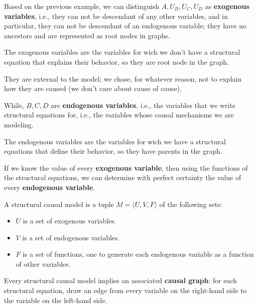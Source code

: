 Based on the previous example, we can distinguish $A, U_B, U_C, U_D$ as \textbf{
    exogenous variables}, i.e., they can not be descendant of any other variables, 
and in particular, they can not be descendant of an endogenous variable; they have 
no ancestors and are represented as root nodes in graphs.

\begin{definition}
    The exogenous variables are the variables for wich we don't have a structural equation
    that explains their behavior, so they are root node in the graph.
\end{definition}

They are external to the model; we chose, for whatever reason, not to explain how 
they are caused (we don't care about cause of cause).

While, $B, C, D$ are \textbf{endogenous variables}, i.e., the variables that we write 
structural equations for, i.e., the variables whose causal mechanisms we are modeling.
 
\begin{definition}
    The endogenous variables are the variables for wich we have a structural equations
    that define their behavior, so they have parents in the graph.
\end{definition}

If we know the value of every \textbf{exogenous variable}, then using the functions of the 
structural equations, we can determine with perfect certainty the value of every
\textbf{endogenous variable}.

\begin{definition}
    A structural causal model is a tuple $M = \langle U, V, F \rangle$ of the following
    sets:
    \begin{itemize}
        \item $U$ is a set of exogenous variables.
        \item $V$ is a set of endogenous variables.
        \item $F$ is a set of functions, one to generate each endogenous variable as a 
        function of other variables.
    \end{itemize}
\end{definition}

Every structural causal model implies an associated \textbf{causal graph}: for each 
structural equation, draw an edge from every variable on the right-hand side to the 
variable on the left-hand side.

